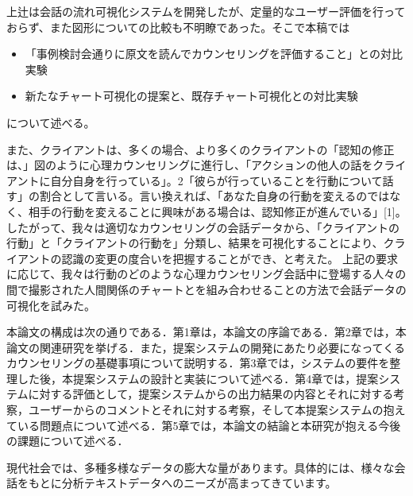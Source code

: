 \documentclass[shuuron]{kuee}
\begin{document}
上辻は会話の流れ可視化システムを開発したが、定量的なユーザー評価を行っておらず、また図形についての比較も不明瞭であった。そこで本稿では
\begin{itemize}
\item 「事例検討会通りに原文を読んでカウンセリングを評価すること」との対比実験
\item 新たなチャート可視化の提案と、既存チャート可視化との対比実験
\end{itemize}
について述べる。

また、クライアントは、多くの場合、より多くのクライアントの「認知の修正は、」図のように心理カウンセリングに進行し、「アクションの他人の話をクライアントに自分自身を行っている」。2「彼らが行っていることを行動について話す」の割合として言いる。言い換えれば、「あなた自身の行動を変えるのではなく、相手の行動を変えることに興味がある場合は、認知修正が進んでいる」[1]。したがって、我々は適切なカウンセリングの会話データから、「クライアントの行動」と「クライアントの行動を」分類し、結果を可視化することにより、クライアントの認識の変更の度合いを把握することができ、と考えた。
上記の要求に応じて、我々は行動のどのような心理カウンセリング会話中に登場する人々の間で撮影された人間関係のチャートとを組み合わせることの方法で会話データの可視化を試みた。

本論文の構成は次の通りである．第1章は，本論文の序論である．第2章では，本論文の関連研究を挙げる．また，提案システムの開発にあたり必要になってくるカウンセリングの基礎事項について説明する．第3章では，システムの要件を整理した後，本提案システムの設計と実装について述べる．第4章では，提案システムに対する評価として，提案システムからの出力結果の内容とそれに対する考察，ユーザーからのコメントとそれに対する考察，そして本提案システムの抱えている問題点について述べる．第5章では，本論文の結論と本研究が抱える今後の課題について述べる．

%

現代社会では、多種多様なデータの膨大な量があります。具体的には、様々な会話をもとに分析テキストデータへのニーズが高まってきています。
\end{document}
